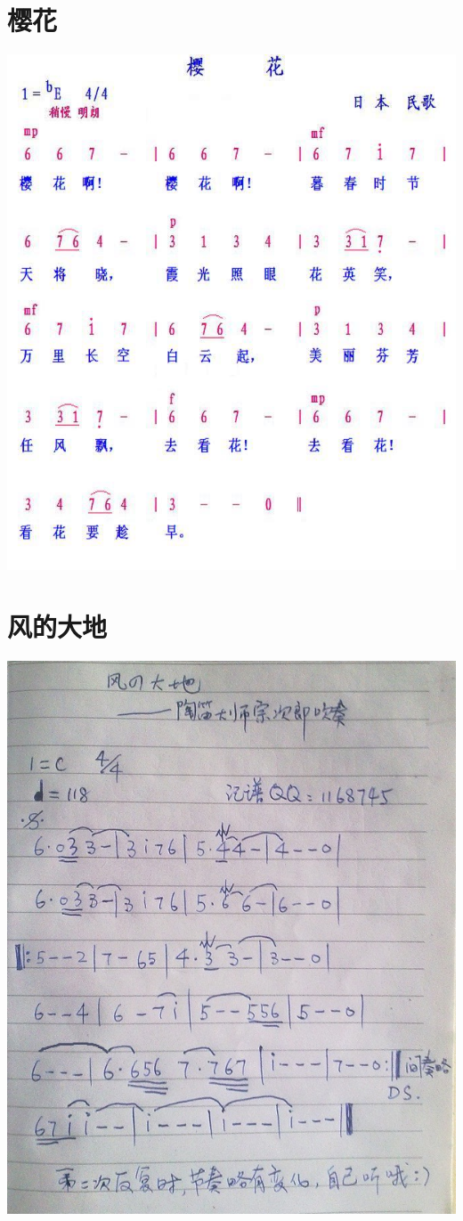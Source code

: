 \documentclass[cn,pad,chinesefont=nofont,twocol]{elegantbook}
\begin{document}
\section{樱花}
	\includegraphics[width=\textwidth]{dongxiao/日本-樱花.jpg}  
\section{风的大地}
	\includegraphics[width=\textwidth]{dongxiao/20200628-日本-风的大地}  
\end{document}

